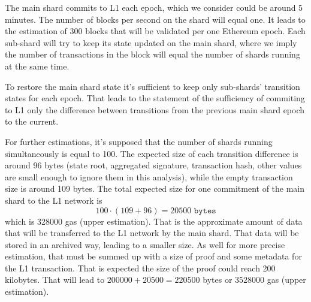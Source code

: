 The main shard commits to L1 each epoch, which we consider could be around 5 minutes.
The number of blocks per second on the shard will equal one. It leads to the estimation of 
300 blocks that will be validated per one Ethereum epoch. Each sub-shard will try to keep 
its state updated on the main shard, where we imply the number of transactions in the block 
will equal the number of shards running at the same time. 

To restore the main shard state it's sufficient to keep only sub-shards' transition states 
for each epoch. That leads to the statement of the sufficiency of commiting to L1 only the 
difference between transitions from the previous main shard epoch to the current.

For further estimations, it's supposed that the number of shards running simultaneously is equal 
to 100. The expected size of each transition difference is around 96 bytes (state root, aggregated signature,
transaction hash, other values are small enough to ignore them in this analysis), 
while the empty transaction size is around 109 bytes. 
The total expected size for one commitment of the main shard to the L1 network 
is 
\[ 100 \cdot (109 + 96) = 20500 \texttt{ bytes} \]
which is 328000 gas (upper estimation). 
That is the approximate amount of data that will be transferred to the L1 network
by the main shard. 
That data will be stored in an archived way, leading to a smaller size. 
As well for more precise estimation, that must be summed up with a size of proof and some metadata 
for the L1 transaction. 
That is expected the size of the proof could reach 200 kilobytes. 
That will lead to $200000 + 20500 = 220500$ bytes or $3528000$ gas (upper estimation).






